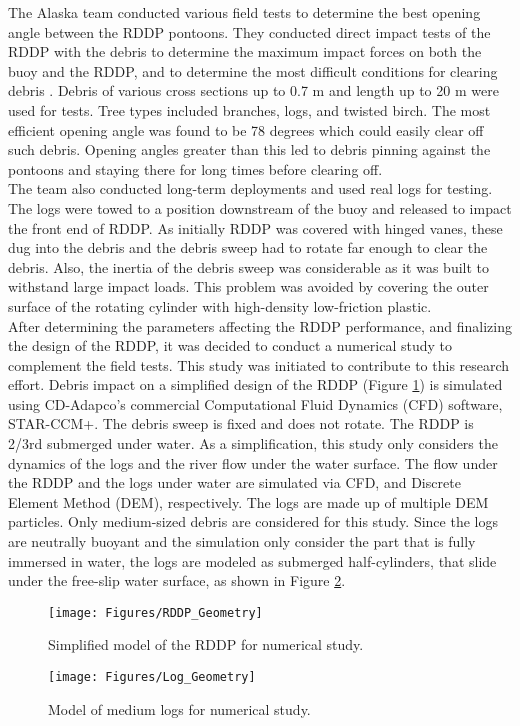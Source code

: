 The Alaska team conducted various field tests to determine the best opening angle between the RDDP pontoons. They conducted direct impact tests of the RDDP with the debris to determine the maximum impact forces on both the buoy and the RDDP, and to determine the most difficult conditions for clearing debris \cite{Reference7}. Debris of various cross sections up to 0.7 m and length up to 20 m were used for tests. Tree types included branches, logs, and twisted birch. The most efficient opening angle was found to be 78 degrees which could easily clear off such debris. Opening angles greater than this led to debris pinning against the pontoons and staying there for long times before clearing off.\\
The team also conducted long-term deployments and used real logs for testing. The logs were towed to a position downstream of the buoy and released to impact the front end of RDDP. As initially RDDP was covered with hinged vanes, these dug into the debris and the debris sweep had to rotate far enough to clear the debris. Also, the inertia of the debris sweep was considerable as it was built to withstand large impact loads. This problem was avoided by covering the outer surface of the rotating cylinder with high-density low-friction plastic.\\
After determining the parameters affecting the RDDP performance, and finalizing the design of the RDDP, it was decided to conduct a numerical study to complement the field tests. This study was initiated to contribute to this research effort. Debris impact on a simplified design of the RDDP (Figure \ref{fig:RDDP_Geometry}) is simulated using CD-Adapco's commercial Computational Fluid Dynamics (CFD) software, STAR-CCM+. The debris sweep is fixed and does not rotate. The RDDP is 2/3rd submerged under water. As a simplification, this study only considers the dynamics of the logs and the river flow under the water surface.  The flow under the RDDP and the logs under water are simulated via CFD, and Discrete Element Method (DEM), respectively. The logs are made up of multiple DEM particles. Only medium-sized debris are considered for this study. Since the logs are neutrally buoyant and the simulation only consider the part that is fully immersed in water, the logs are modeled as submerged half-cylinders, that slide under the free-slip water surface, as shown in Figure \ref{fig:Log_Geometry}.
\begin{figure}
\centering
\texttt{[image: Figures/RDDP\_Geometry]}
\caption{\label{fig:RDDP_Geometry}Simplified model of the RDDP for numerical study.}
\end{figure}
\begin{figure}
\centering
\texttt{[image: Figures/Log\_Geometry]}
\caption{\label{fig:Log_Geometry}Model of medium logs for numerical study.}
\end{figure}














